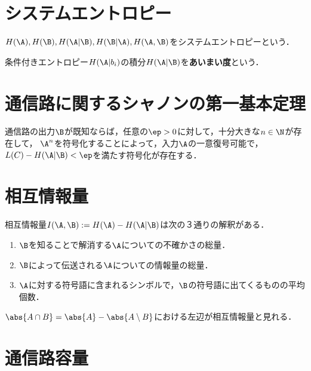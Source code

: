 \documentclass[uplatex,dvipdfmx]{jsreport}
\begin{document}
\section{システムエントロピー}

\begin{tcolorbox}[colframe=ForestGreen, colback=ForestGreen!10!white,breakable,colbacktitle=ForestGreen!40!white,coltitle=black,fonttitle=\bfseries\sffamily,
title=]
    $H(\A),H(\B),H(\A|\B),H(\B|\A),H(\A,\B)$をシステムエントロピーという．
\end{tcolorbox}

\begin{discussion}[equivocation]
    条件付きエントロピー$H(\A|b_i)$の積分$H(\A|\B)$を\textbf{あいまい度}という．
\end{discussion}

\section{通信路に関するシャノンの第一基本定理}

\begin{theorem}
    通信路の出力$\B$が既知ならば，任意の$\ep>0$に対して，十分大きな$n\in\N$が存在して，
    $\A^n$を符号化することによって，入力$\A$の一意復号可能で，$L(C)-H(\A|\B)<\ep$を満たす符号化が存在する．
\end{theorem}

\section{相互情報量}

\begin{discussion}
    相互情報量$I(\A,\B):=H(\A)-H(\A|\B)$は次の３通りの解釈がある．
    \begin{enumerate}
        \item $\B$を知ることで解消する$\A$についての不確かさの総量．
        \item $\B$によって伝送される$\A$についての情報量の総量．
        \item $\A$に対する符号語に含まれるシンボルで，$\B$の符号語に出てくるものの平均個数．
    \end{enumerate}
\end{discussion}
\begin{remarks}[数え上げ測度の例]
    $\abs{A\cap B}=\abs{A}-\abs{A\setminus B}$における左辺が相互情報量と見れる．
\end{remarks}

\section{通信路容量}
\end{document}
